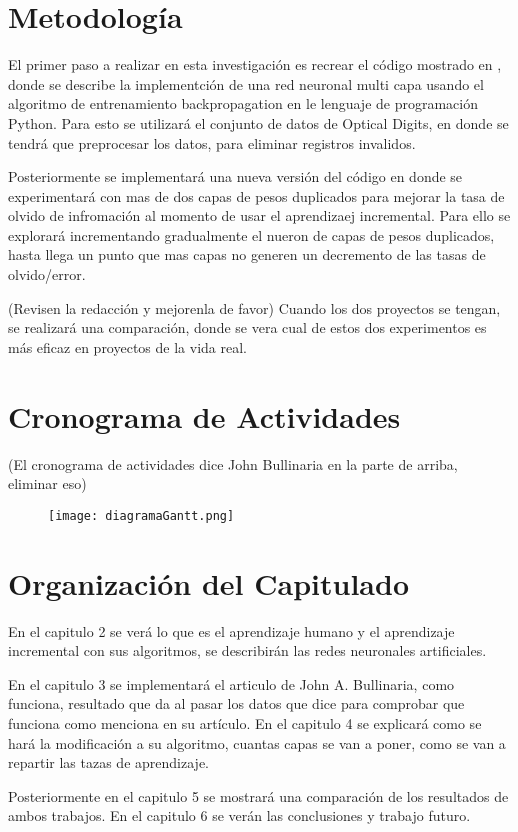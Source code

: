 \section{Metodología}
    El primer paso a realizar en esta investigación es recrear el código mostrado en \cite{bullinaria2009}, donde se describe la implementción de una red  neuronal multi capa usando el algoritmo de entrenamiento backpropagation en le lenguaje de programación Python.  Para esto se utilizará el conjunto de datos de Optical Digits,  en donde se tendrá que preprocesar los datos, para eliminar registros invalidos. 

    Posteriormente se implementará una nueva versión del código en donde se experimentará con mas de dos capas de pesos duplicados para mejorar la tasa de olvido de infromación al momento de usar el aprendizaej incremental.  Para ello se explorará incrementando gradualmente el nueron de capas de pesos duplicados, hasta llega un punto que mas capas no generen un decremento de las tasas de olvido/error.

(Revisen la redacción y mejorenla de favor)
    Cuando los dos proyectos se tengan, se realizar\'a una comparación, donde se vera cual de estos dos experimentos
    es más eficaz en proyectos de la vida real.
    
\section{Cronograma de Actividades}
(El cronograma de actividades dice John Bullinaria en la parte de arriba, eliminar eso)

    \begin{figure}[H]
        \centering
        \texttt{[image: diagramaGantt.png]}
        \label{fig:fig3}
    \end{figure}

\section{Organización del Capitulado}


	En el capitulo 2 se ver\'a lo que es el aprendizaje humano y el aprendizaje incremental con sus algoritmos, se describirán las redes neuronales artificiales.

En el capitulo 3 se implementar\'a el articulo de John A. Bullinaria, como funciona, resultado que da al pasar los datos que dice para comprobar que funciona como menciona en su art\'iculo. En el capitulo 4 se explicar\'a como se hará la modificación a su algoritmo, cuantas capas se van a poner, como se van a repartir las tazas de aprendizaje.

Posteriormente en el capitulo 5 se mostrar\'a una comparación de los resultados de ambos trabajos. En el capitulo 6 se verán las conclusiones y trabajo futuro.

